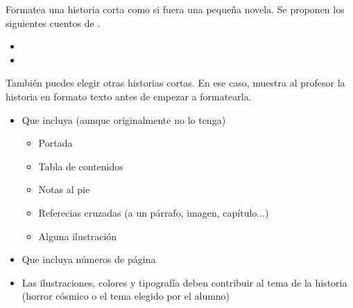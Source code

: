 \newpage

\begin{homeworkProblem}
  Formatea una historia corta como si fuera una pequeña novela. Se proponen los siguientes cuentos de . 
  \begin{itemize}
  \item {}
  \item {}
  \end{itemize}
  También puedes elegir otras historias cortas. En ese caso, muestra al profesor la historia en formato texto antes de empezar a formatearla.

  \begin{Aviso}

    \begin{itemize}
    \item Que incluya (aunque originalmente no lo tenga)
      \begin{itemize}
      \item Portada
      \item Tabla de contenidos
      \item Notas al pie
      \item Referecias cruzadas (a un párrafo, imagen, capítulo...)
      \item Alguna ilustración
      \end{itemize}
    \item Que incluya números de página
    \item Las ilustraciones, colores y tipografía deben contribuir al tema de la historia (horror cósmico o el tema elegido por el alumno)
    \end{itemize}
  \end{Aviso}
  
\end{homeworkProblem}




